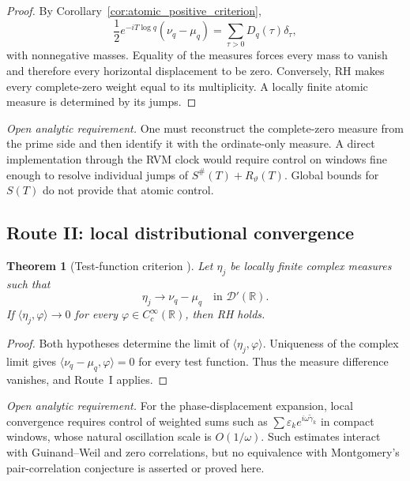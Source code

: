 \documentclass[11pt]{amsart}
\numberwithin{equation}{section}
\theoremstyle{plain}
\newtheorem{theorem}{Theorem}[section]
\theoremstyle{definition}
\theoremstyle{remark}
\newcommand{\1}{\mathbf{1}}
\begin{document}
\begin{proof}
By Corollary~\ref{cor:atomic_positive_criterion},
\begin{equation}
\frac12e^{-iT\log q}(\nu_q-\mu_q)
=
\sum_{\tau>0}D_q(\tau)\delta_\tau,
\label{eq:route_atomic_positive_measure}
\end{equation}
with nonnegative masses.  Equality of the measures forces every mass to
vanish and therefore every horizontal displacement to be zero.  Conversely,
RH makes every complete-zero weight equal to its multiplicity.  A locally
finite atomic measure is determined by its jumps.
\end{proof}

\medskip\noindent\emph{Open analytic requirement.} One must reconstruct the complete-zero measure from the prime side
and then identify it with the ordinate-only measure.  A direct implementation
through the RVM clock would require control on windows fine enough to resolve
individual jumps of $S^{\#}(T)+R_\vartheta(T)$.  Global bounds for $S(T)$ do
not provide that atomic control.

\subsection{Route II: local distributional convergence}
\label{subsec:route_distributional}


\begin{theorem}[Test-function criterion {}]
\label{thm:test_function_criterion}
Let $\eta_j$ be locally finite complex measures such that
\begin{equation}
\eta_j\longrightarrow\nu_q-\mu_q
\quad\text{in }\mathcal D'(\mathbb R).
\label{eq:test_measure_identification}
\end{equation}
If $\langle\eta_j,\varphi\rangle\to0$ for every
$\varphi\in C_c^\infty(\mathbb R)$, then RH holds.
\end{theorem}

\begin{proof}
Both hypotheses determine the limit of
$\langle\eta_j,\varphi\rangle$.  Uniqueness of the complex limit gives
$\langle\nu_q-\mu_q,\varphi\rangle=0$ for every test function.  Thus the
measure difference vanishes, and Route~I applies.
\end{proof}

\medskip\noindent\emph{Open analytic requirement.} For the phase-displacement expansion, local convergence requires
control of weighted sums such as
$\sum\varepsilon_k e^{i\omega\widetilde\gamma_k}$ in compact windows,
whose natural oscillation scale is $O(1/\omega)$.  Such estimates interact
with Guinand--Weil and zero correlations, but no equivalence with
Montgomery's pair-correlation conjecture \cite{Montgomery1973} is asserted
or proved here.
\end{document}
